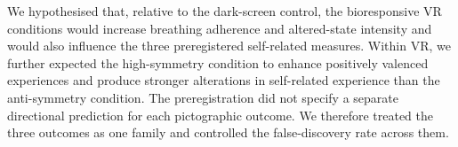 We hypothesised that, relative to the dark-screen control, the bioresponsive VR conditions would increase breathing adherence and altered-state intensity and would also influence the three preregistered self-related measures. Within VR, we further expected the high-symmetry condition to enhance positively valenced experiences and produce stronger alterations in self-related experience than the anti-symmetry condition. The preregistration did not specify a separate directional prediction for each pictographic outcome. We therefore treated the three outcomes as one family and controlled the false-discovery rate across them.


